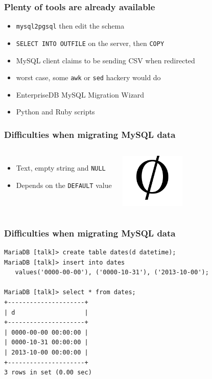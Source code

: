 \documentclass{beamer}
\begin{document}
\begin{frame}[fragile]
  \frametitle{Plenty of tools are already available}
  
  \vfill

  \begin{itemize}
  \item \texttt{mysql2pgsql} then edit the schema
  \item \texttt{SELECT INTO OUTFILE} on the server, then \texttt{COPY}
  \item MySQL client claims to be sending CSV when redirected
  \item worst case, some \texttt{awk} or \texttt{sed} hackery would do
  \item EnterpriseDB MySQL Migration Wizard
  \item Python and Ruby scripts
  \end{itemize}  
\end{frame}

\begin{frame}[fragile]
  \frametitle{Difficulties when migrating MySQL data}
  
  \vfill

\begin{columns}
  \begin{itemize}
  \item Text, empty string and \texttt{NULL}
  \item Depends on the \texttt{DEFAULT} value
  \end{itemize}
\begin{center}
  \includegraphics[height=7em]{EmptySet_L.png}
\end{center}
\end{columns}
\end{frame}

\begin{frame}[fragile]
  \frametitle{Difficulties when migrating MySQL data}
  
  \vfill

\begin{verbatim}
MariaDB [talk]> create table dates(d datetime);
MariaDB [talk]> insert into dates
   values('0000-00-00'), ('0000-10-31'), ('2013-10-00');

MariaDB [talk]> select * from dates;
+---------------------+
| d                   |
+---------------------+
| 0000-00-00 00:00:00 |
| 0000-10-31 00:00:00 |
| 2013-10-00 00:00:00 |
+---------------------+
3 rows in set (0.00 sec)
\end{verbatim}
\end{frame}
\end{document}
